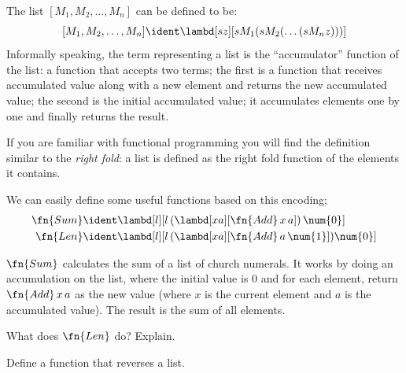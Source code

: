 \documentclass[../../../include/open-logic-section]{subfiles}
\begin{document}

The list $[M_1, M_2, \ldots, M_n]$ can be defined to be:
\[
  [M_1, M_2, \ldots, M_n] \ident \lambd[sz][s M_1 (s M_2 (\ldots (s M_n z)))]
\]
Informally speaking, the term representing a list is the
``accumulator'' function of the list: a function that accepts two
terms; the first is a function that receives accumulated value along
with a new element and returns the new accumulated value; the second
is the initial accumulated value; it accumulates elements one by one
and finally returns the result.

\begin{digress}
  If you are familiar with functional programming you will find the
  definition similar to the \emph{right fold}: a list is defined as
  the right fold function of the elements it contains.
\end{digress}

We can easily define some useful functions based on this encoding; 
\begin{align*}
  \fn{Sum} & \ident
  \lambd[l][l \, (\lambd[xa][\fn{Add} \, x \, a])\,  \num{0}]\\
  \fn{Len} & \ident
  \lambd[l][l \, (\lambd[xa][\fn{Add} \, a \, \num{1}]) \num{0}]
\end{align*}

$\fn{Sum}$ calculates the sum of a list of church numerals. It works
by doing an accumulation on the list, where the initial value is
$\num{0}$ and for each element, return $\fn{Add} \, x\, a$ as the new
value (where $x$ is the current element and $a$ is the accumulated
value). The result is the sum of all elements.

\begin{prob}
  What does $\fn{Len}$ do? Explain.
\end{prob}

\begin{prob}
  Define a function that reverses a list.
\end{prob}
\end{document}
